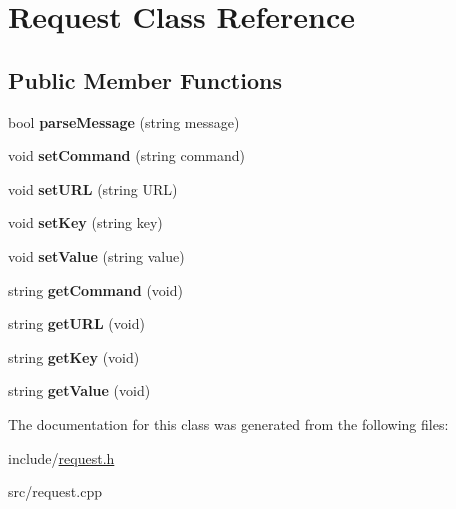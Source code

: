 \hypertarget{classRequest}{}\section{Request Class Reference}
\label{classRequest}
\subsection*{Public Member Functions}
\begin{DoxyCompactItemize}
\item 
\mbox{\label{classRequest_a0e6d43ab05a6c0ff06679177e1004ddc}} 
bool {\bfseries parse\+Message} (string message)
\item 
\mbox{\label{classRequest_a4fe67f0c9cccfd530174eb3d8fb54013}} 
void {\bfseries set\+Command} (string command)
\item 
\mbox{\label{classRequest_a1a46a4b8f73d3eb03c39ada91b26eeed}} 
void {\bfseries set\+U\+RL} (string U\+RL)
\item 
\mbox{\label{classRequest_a56210902bb0d240b4615d6fde144ea42}} 
void {\bfseries set\+Key} (string key)
\item 
\mbox{\label{classRequest_a2f8dbfdcbf1d9f07e8d1aa7216b044e3}} 
void {\bfseries set\+Value} (string value)
\item 
\mbox{\label{classRequest_a95ef26627def0c193c332b9bfd4ebf8e}} 
string {\bfseries get\+Command} (void)
\item 
\mbox{\label{classRequest_a49d0bafc034c350c8af8c3bb666e0099}} 
string {\bfseries get\+U\+RL} (void)
\item 
\mbox{\label{classRequest_aef5c14196e6a7c021f3797fc2a43473c}} 
string {\bfseries get\+Key} (void)
\item 
\mbox{\label{classRequest_adf447291d428212c0c6d93e4c72fb127}} 
string {\bfseries get\+Value} (void)
\end{DoxyCompactItemize}


The documentation for this class was generated from the following files\+:\begin{DoxyCompactItemize}
\item 
include/\hyperlink{request_8h}{request.\+h}\item 
src/request.\+cpp\end{DoxyCompactItemize}
